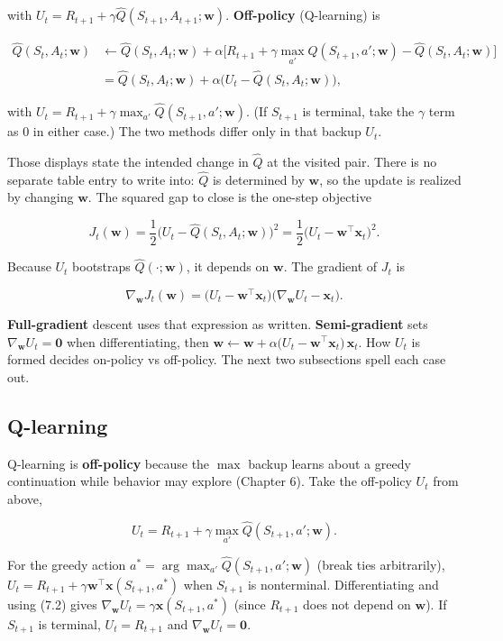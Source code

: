 with $U_t=R_{t+1}+\gamma\hat{Q}(S_{t+1},A_{t+1};\mathbf{w})$. \textbf{Off-policy} (Q-learning) is

\[
\begin{aligned}
\hat{Q}(S_t,A_t;\mathbf{w})
&\leftarrow
\hat{Q}(S_t,A_t;\mathbf{w})
+
\alpha\bigl[R_{t+1}+\gamma\max_{a'}\hat{Q}(S_{t+1},a';\mathbf{w})-\hat{Q}(S_t,A_t;\mathbf{w})\bigr]
\\
&=
\hat{Q}(S_t,A_t;\mathbf{w})
+
\alpha\bigl(U_t-\hat{Q}(S_t,A_t;\mathbf{w})\bigr),
\end{aligned}
\]

with $U_t=R_{t+1}+\gamma\max_{a'}\hat{Q}(S_{t+1},a';\mathbf{w})$. (If $S_{t+1}$ is terminal, take the $\gamma$ term as $0$ in either case.) The two methods differ only in that backup $U_t$.

Those displays state the intended change in $\hat{Q}$ at the visited pair. There is no separate table entry to write into: $\hat{Q}$ is determined by $\mathbf{w}$, so the update is realized by changing $\mathbf{w}$. The squared gap to close is the one-step objective

\[
J_t(\mathbf{w})
=
\frac{1}{2}\bigl(U_t-\hat{Q}(S_t,A_t;\mathbf{w})\bigr)^2
=
\frac{1}{2}\bigl(U_t-\mathbf{w}^\top\mathbf{x}_t\bigr)^2.
\]

Because $U_t$ bootstraps $\hat{Q}(\cdot;\mathbf{w})$, it depends on $\mathbf{w}$. The gradient of $J_t$ is

\[
\nabla_{\mathbf{w}} J_t(\mathbf{w})
=
\bigl(U_t-\mathbf{w}^\top\mathbf{x}_t\bigr)
\bigl(\nabla_{\mathbf{w}} U_t-\mathbf{x}_t\bigr).
\]

\textbf{Full-gradient} descent uses that expression as written. \textbf{Semi-gradient} sets $\nabla_{\mathbf{w}} U_t=\mathbf{0}$ when differentiating, then $\mathbf{w}\leftarrow\mathbf{w}+\alpha\bigl(U_t-\mathbf{w}^\top\mathbf{x}_t\bigr)\,\mathbf{x}_t$. How $U_t$ is formed decides on-policy vs off-policy. The next two subsections spell each case out.

\subsection{Q-learning}

Q-learning is \textbf{off-policy} because the $\max$ backup learns about a greedy continuation while behavior may explore (Chapter 6). Take the off-policy $U_t$ from above,

\[
U_t=R_{t+1}+\gamma\max_{a'}\hat{Q}(S_{t+1},a';\mathbf{w}).
\]

For the greedy action $a^*=\arg\max_{a'}\hat{Q}(S_{t+1},a';\mathbf{w})$ (break ties arbitrarily), $U_t=R_{t+1}+\gamma\mathbf{w}^\top\mathbf{x}(S_{t+1},a^*)$ when $S_{t+1}$ is nonterminal. Differentiating and using (7.2) gives $\nabla_{\mathbf{w}} U_t=\gamma\mathbf{x}(S_{t+1},a^*)$ (since $R_{t+1}$ does not depend on $\mathbf{w}$). If $S_{t+1}$ is terminal, $U_t=R_{t+1}$ and $\nabla_{\mathbf{w}} U_t=\mathbf{0}$.

